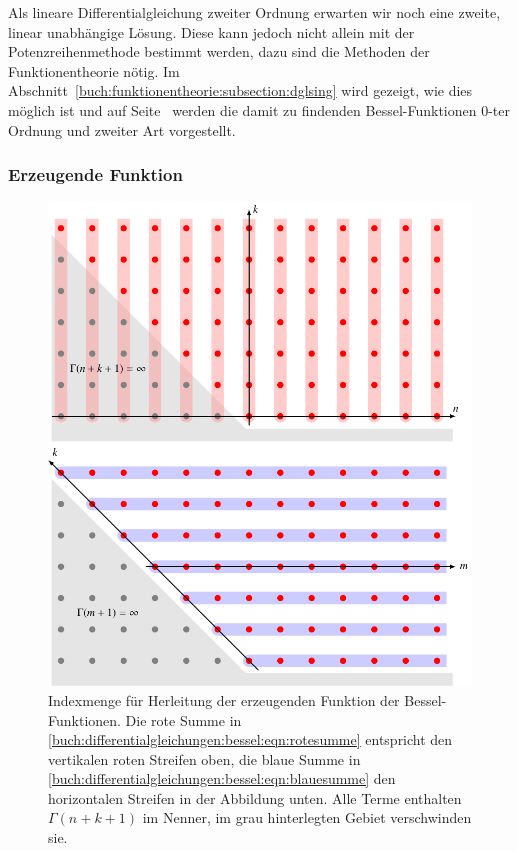 Als lineare Differentialgleichung zweiter Ordnung erwarten wir noch
eine zweite, linear unabhängige Lösung.
Diese kann jedoch nicht allein mit der Potenzreihenmethode
bestimmt werden,
dazu sind die Methoden der Funktionentheorie nötig.
Im Abschnitt~\ref{buch:funktionentheorie:subsection:dglsing}
wird gezeigt, wie dies möglich ist und auf
Seite~\pageref{buch:funktionentheorie:subsubsection:bessel2art}
werden die damit zu findenden Bessel-Funktionen 0-ter Ordnung und
zweiter Art vorgestellt.

%
%
\subsubsection{Erzeugende Funktion}
\begin{figure}
\centering
\includegraphics{chapters/050-differential/images/besselgrid.pdf}
\caption{Indexmenge für Herleitung der erzeugenden Funktion der
Bessel-Funktionen.
Die rote Summe in \eqref{buch:differentialgleichungen:bessel:eqn:rotesumme}
entspricht den vertikalen roten Streifen oben,
die blaue Summe in
\eqref{buch:differentialgleichungen:bessel:eqn:blauesumme}
den horizontalen Streifen in der Abbildung unten.
Alle Terme enthalten $\Gamma(n+k+1)$ im Nenner,
im grau hinterlegten Gebiet verschwinden sie.
\label{buch:differentialgleichungen:bessel:fig:indexmenge}}
\end{figure}

